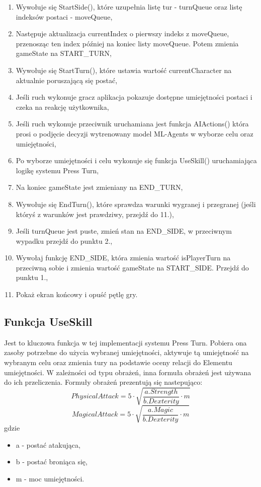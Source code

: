 \documentclass{SGGW-thesis}
\begin{document}
\begin{enumerate}
  \item{Wywołuje się StartSide(), które uzupełnia listę tur - turnQueue oraz listę indeksów postaci - moveQueue},
  \item{Następuje aktualizacja currentIndex o pierwszy indeks z moveQueue, przenosząc ten index później na koniec listy moveQueue. Potem zmienia gameState na START\_TURN},
  \item{Wywołuje się StartTurn(), które ustawia wartość currentCharacter na aktualnie poruszającą się postać},
  \item{Jeśli ruch wykonuje gracz aplikacja pokazuje dostępne umiejętności postaci i czeka na reakcję użytkownika},
  \item{Jeśli ruch wykonuje przeciwnik uruchamiana jest funkcja AIActions() która prosi o podjęcie decyzji wytrenowany model ML-Agents w wyborze celu oraz umiejętności},
  \item{Po wyborze umiejętności i celu wykonuje się funkcja UseSkill() uruchamiająca logikę systemu Press Turn},
  \item{Na koniec gameState jest zmieniany na END\_TURN},
  \item{Wywołuje się EndTurn(), które sprawdza warunki wygranej i przegranej (jeśli któryś z warunków jest prawdziwy, przejdź do 11.)},
  \item{Jeśli turnQueue jest puste, zmień stan na END\_SIDE, w przeciwnym wypadku przejdź do punktu 2.},
  \item{Wywołaj funkcję END\_SIDE, która zmienia wartość isPlayerTurn na przeciwną sobie i zmienia wartość gameState na START\_SIDE. Przejdź do punktu 1.},
  \item{Pokaż ekran końcowy i opuść pętlę gry}.
\end{enumerate}
\pagebreak
\subsection{Funkcja UseSkill}
Jest to kluczowa funkcja w tej implementacji systemu Press Turn. Pobiera ona zasoby potrzebne do użycia wybranej umiejętności, aktywuje tą umiejętność na wybranym celu oraz zmienia tury na podstawie oceny relacji do Elementu umiejętności.
W zależności od typu obrażeń, inna formuła obrażeń jest używana do ich przeliczenia. Formuły obrażeń prezentują się nastepująco:
\[PhysicalAttack = 5\cdot\sqrt{\frac{a.Strength}{b.Dexterity}\cdot m}\]\[MagicalAttack = 5\cdot\sqrt{\frac{a.Magic}{b.Dexterity}\cdot m}\]
gdzie
\begin{itemize}
  \item{a - postać atakująca},
  \item{b - postać broniąca się},
  \item{m - moc umiejętności}.
\end{itemize}
\end{document}
